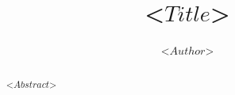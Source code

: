 \documentclass{article}
\title{<$ Title $>}
\author{<$ Author $>}
\begin{document}
\maketitle

\begin{abstract}
    <$ Abstract $>
\end{abstract}
\end{document}
